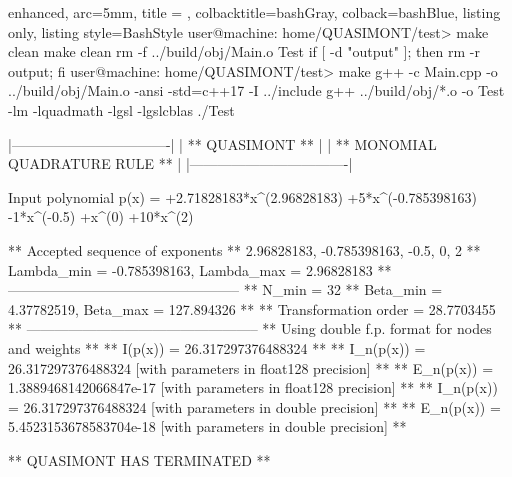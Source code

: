 \documentclass[a4paper, twosided]{book}
\begin{document}
\newpage 

\begin{tcblisting}{enhanced,
                   arc=5mm,
                   title = \color{black}{\large \ttfamily Building and executing the test driver: p\_1(x)},
                   colbacktitle=bashGray,
                   colback=bashBlue,
                   listing only,
                   listing style=BashStyle}
user@machine: home/QUASIMONT/test> make clean
make clean
rm -f ../build/obj/Main.o Test
if [ -d "output" ]; then rm -r output; fi
user@machine: home/QUASIMONT/test> make
g++ -c Main.cpp -o ../build/obj/Main.o -ansi -std=c++17 -I ../include
g++ ../build/obj/*.o -o Test -lm -lquadmath -lgsl -lgslcblas
./Test

    |----------------------------------|
    |          ** QUASIMONT **         |
    |  ** MONOMIAL QUADRATURE RULE **  |
    |----------------------------------|

 Input polynomial p(x) =  +2.71828183*x^(2.96828183) +5*x^(-0.785398163) -1*x^(-0.5) +x^(0)  +10*x^(2)

 ** Accepted sequence of exponents ** 
    {2.96828183, -0.785398163, -0.5, 0, 2}
 ** Lambda_min = -0.785398163, Lambda_max = 2.96828183 **
 --------------------------------------------------
 ** N_min = 32
 ** Beta_min = 4.37782519, Beta_max = 127.894326 **
 ** Transformation order = 28.7703455 **
 --------------------------------------------------
 ** Using double f.p. format for nodes and weights **
 ** I(p(x))   = 26.317297376488324 **
 ** I_n(p(x)) = 26.317297376488324      [with parameters in float128 precision] **
 ** E_n(p(x)) = 1.3889468142066847e-17  [with parameters in float128 precision] **
 ** I_n(p(x)) = 26.317297376488324      [with parameters in double precision] **
 ** E_n(p(x)) = 5.4523153678583704e-18  [with parameters in double precision] **

 ** QUASIMONT HAS TERMINATED **
\end{tcblisting}
\vspace{0.15cm}
\end{document}
